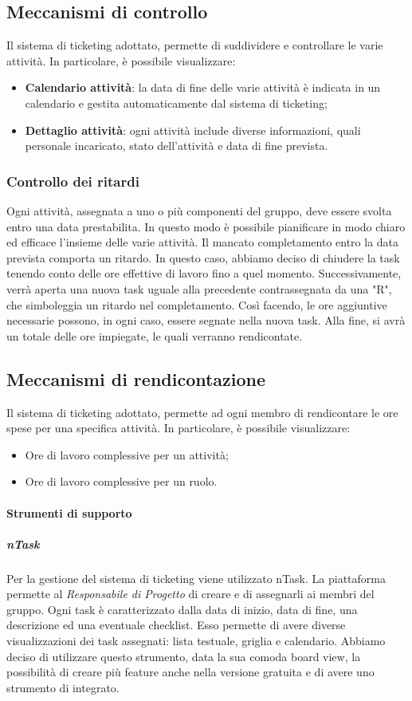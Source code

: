 \subsection{Meccanismi di controllo}
Il sistema di ticketing adottato, permette di suddividere e controllare le varie attività. In particolare, è possibile visualizzare:
\begin{itemize}
\item{\textbf{Calendario attività}}: la data di fine delle varie attività è indicata in un calendario e gestita automaticamente dal sistema di ticketing;  
\item{\textbf{Dettaglio attività}}: ogni attività include diverse informazioni, quali personale incaricato, stato dell'attività e data di fine prevista. 
\end{itemize}
\subsubsection{Controllo dei ritardi}
Ogni attività, assegnata a uno o più componenti del gruppo, deve essere svolta entro una data prestabilita. In questo modo è possibile pianificare in modo chiaro ed efficace l'insieme delle varie attività. Il mancato completamento entro la data prevista comporta un ritardo. In questo caso, abbiamo deciso di chiudere la task tenendo conto delle ore effettive di lavoro fino a quel momento. Successivamente, verrà aperta una nuova task uguale alla precedente contrassegnata da una "R", che simboleggia un ritardo nel completamento. Così facendo, le ore aggiuntive necessarie possono, in ogni caso, essere segnate nella nuova task. Alla fine, si avrà un totale delle ore impiegate, le quali verranno rendicontate.

\subsection{Meccanismi di rendicontazione}
Il sistema di ticketing adottato, permette ad ogni membro di rendicontare le ore spese per una specifica attività. In particolare, è possibile visualizzare:
\begin{itemize}
\item{Ore di lavoro complessive per un attività;}
\item{Ore di lavoro complessive per un ruolo.}
\end{itemize}

\paragraph{Strumenti di supporto}
\subparagraph{nTask} \Spazio
Per la gestione del sistema di ticketing viene utilizzato nTask. La piattaforma permette al \emph{Responsabile di Progetto} di creare  e di assegnarli ai membri del gruppo. Ogni task è caratterizzato dalla
data di inizio, data di fine, una descrizione ed una eventuale checklist. Esso permette di avere diverse visualizzazioni dei task assegnati: lista testuale, griglia e calendario. Abbiamo deciso di utilizzare questo strumento, data la sua comoda board view, la possibilità di creare più feature anche nella versione gratuita e di avere uno strumento di  integrato.

